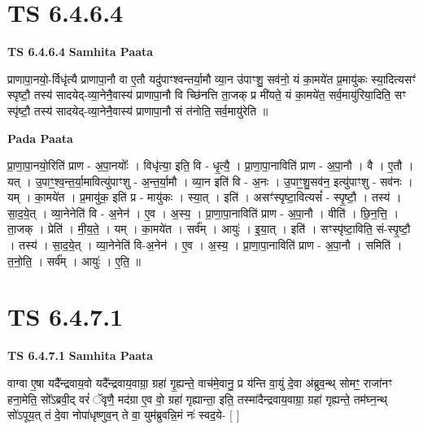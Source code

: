 \documentclass[17pt]{extarticle}
\begin{document}
\section*{ TS 6.4.6.4 }

\textbf{TS 6.4.6.4 } \newline
\textbf{Samhita Paata} \newline

प्राणापा॒नयो॒-र्विधृ॑त्यै प्राणापा॒नौ वा ए॒तौ यदु॑पाꣳश्वन्तर्या॒मौ व्या॒न उ॑पाꣳशु॒ सव॑नो॒ यं का॒मये॑त प्र॒मायु॑कः स्या॒दित्यसꣳ॑ स्पृष्टौ॒ तस्य॑ सादयेद्-व्या॒नेनै॒वास्य॑ प्राणापा॒नौ वि च्छि॑नत्ति ता॒जक् प्र मी॑यते॒ यं का॒मये॑त॒ सर्व॒मायु॑रिया॒दिति॒ सꣳ स्पृ॑ष्टौ॒ तस्य॑ सादयेद्-व्या॒नेनै॒वास्य॑ प्राणापा॒नौ सं त॑नोति॒ सर्व॒मायु॑रेति ॥ \newline

\textbf{Pada Paata} \newline

प्रा॒णा॒पा॒नयो॒रिति॑ प्राण - अ॒पा॒नयोः᳚ । विधृ॑त्या॒ इति॒ वि - धृ॒त्यै॒ । प्रा॒णा॒पा॒नाविति॑ प्राण - अ॒पा॒नौ । वै । ए॒तौ । यत् । उ॒पाꣳ॒॒श्व॒न्त॒र्या॒मावित्यु॑पाꣳशु - अ॒न्त॒र्या॒मौ । व्या॒न इति॑ वि - अ॒नः । उ॒पाꣳ॒॒शु॒सव॑न॒ इत्यु॑पाꣳशु - सव॑नः । यम् । का॒मये॑त । प्र॒मायु॑क॒ इति॑ प्र - मायु॑कः । स्या॒त् । इति॑ । असꣳ॑स्पृष्टा॒वित्यसं᳚ - स्पृ॒ष्टौ॒ । तस्य॑ । सा॒द॒ये॒त् । व्या॒नेनेति॑ वि - अ॒नेन॑ । ए॒व । अ॒स्य॒ । प्रा॒णा॒पा॒नाविति॑ प्राण - अ॒पा॒नौ । वीति॑ । छि॒न॒त्ति॒ । ता॒जक् । प्रेति॑ । मी॒य॒ते॒ । यम् । का॒मये॑त । सर्व᳚म् । आयुः॑ । इ॒या॒त् । इति॑ । सꣳस्पृ॑ष्टा॒विति॒ सं-स्पृ॒ष्टौ॒ । तस्य॑ । सा॒द॒ये॒त् । व्या॒नेनेति॑ वि-अ॒नेन॑ । ए॒व । अ॒स्य॒ । प्रा॒णा॒पा॒नाविति॑ प्राण - अ॒पा॒नौ । समिति॑ । त॒नो॒ति॒ । सर्व᳚म् । आयुः॑ । ए॒ति॒ ॥  \newline




\section*{ TS 6.4.7.1 }

\textbf{TS 6.4.7.1 } \newline
\textbf{Samhita Paata} \newline

वाग्वा ए॒षा यदै᳚न्द्रवाय॒वो यदै᳚न्द्रवाय॒वाग्रा॒ ग्रहा॑ गृ॒ह्यन्ते॒ वाच॑मे॒वानु॒ प्र य॑न्ति वा॒युं दे॒वा अ॑ब्रुव॒न्थ् सोमꣳ॒॒ राजा॑नꣳ हना॒मेति॒ सो᳚ऽब्रवी॒द् वरं॑ ॅवृणै॒ मद॑ग्रा ए॒व वो॒ ग्रहा॑ गृह्यान्ता॒ इति॒ तस्मा॑दैन्द्रवाय॒वाग्रा॒ ग्रहा॑ गृह्यन्ते॒ तम॑घ्न॒न्थ् सो॑ऽपूय॒त् तं दे॒वा नोपा॑धृष्णुव॒न् ते वा॒ युम॑ब्रुवन्नि॒मं नः॑ स्वद॒ये- [  ] \newline
\end{document}
